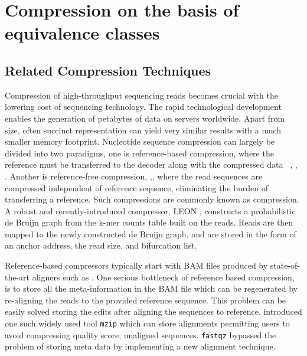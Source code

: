 \chapter{Compression on the basis of equivalence classes}

\section{Related Compression Techniques}
Compression of high-throughput sequencing reads becomes crucial with the lowering cost of sequencing technology. The rapid technological development enables the generation of petabytes of data on servers worldwide. Apart from size, often succinct representation \citep{Pritt2016} can yield very similar results with a much smaller memory footprint. Nucleotide sequence compression can largely be divided into two paradigms, one is reference-based compression, where the reference must be transferred to the decoder along with the compressed data ~\citep{Canovas2014}, \citep{Fritz2011}, \citep{Li2014}. Another is reference-free compression, \citep{adjeroh2002dna},\citep{Bonfield_2014}, \citep{Hach2012} where the read sequences are compressed independent of reference sequence, eliminating the burden of transferring a reference. Such compressions are commonly known as \Denovo compression. A robust and recently-introduced \denovo compressor, LEON \citep{Benoit2015}, constructs a probabilistic de Bruijn graph from the k-mer counts table built on the reads. Reads are then mapped to the newly constructed de Bruijn graph, and are stored in the form of an anchor address, the read size, and bifurcation list.   

Reference-based compressors typically start with BAM files produced by state-of-the-art aligners such as \Bowtie. One serious bottleneck of reference based compression, is to store all the meta-information in the BAM file which can be regenerated by re-aligning the reads to the provided reference sequence. This problem can be easily solved storing the edits after aligning the sequences to reference. \citet{Fritz2011} introduced one such widely used tool \texttt{mzip} which can store alignments permitting users to avoid compressing quality score, unaligned sequences. \texttt{fastqz} \citep{bonfield2013compression} bypassed the problem of storing meta data by implementing a new alignment technique.

